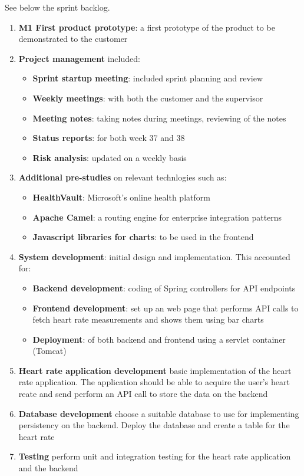 See below the sprint backlog.
\begin{enumerate}[1.]
	\item \textbf{M1 First product prototype}:\newline
		a first prototype of the product to be demonstrated to the customer
	\item \textbf{Project management} included:
		\begin{itemize}
			\item \textbf{Sprint startup meeting}:
				included sprint planning and review
			\item \textbf{Weekly meetings}:
				with both the customer and the supervisor
			\item \textbf{Meeting notes}:
				taking notes during meetings, reviewing of the notes
			\item \textbf{Status reports}:
				for both week 37 and 38
			\item \textbf{Risk analysis}:
				updated on a weekly basis
		\end{itemize}
	\item \textbf{Additional pre-studies} on relevant technlogies such as:
	\begin{itemize}
		\item \textbf{HealthVault}: Microsoft's online health platform
		\item \textbf{Apache Camel}: a routing engine for enterprise integration patterns
		\item \textbf{Javascript libraries for charts}: to be used in the frontend
	\end{itemize}
	\item \textbf{System development}: initial design and implementation. This accounted for:
	\begin{itemize}
		\item \textbf{Backend development}:
			coding of Spring controllers for API endpoints
		\item \textbf{Frontend development}:
			set up an web page that performs API calls to fetch heart rate measurements
			and shows them using bar charts
		\item \textbf{Deployment}:
			of both backend and frontend using a servlet container (Tomcat)
	\end{itemize}
	\item \textbf{Heart rate application development}\newline
		basic implementation of the heart rate application. The application should be able to acquire
		the user's heart reate and send perform an API call to store the data on the backend
	\item \textbf{Database development}\newline
		choose a suitable database to use for implementing persistency on the backend.
		Deploy the database and create a table for the heart rate
	\item \textbf{Testing}\newline
		perform unit and integration testing for the heart rate application and the backend
\end{enumerate}